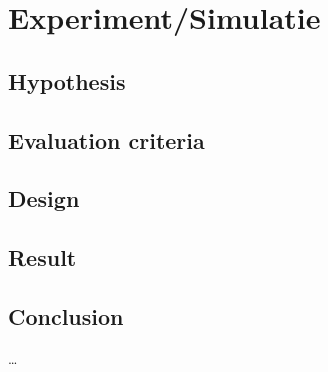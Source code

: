 \chapter{Experiment/Simulatie}                                  \label{ch:experiment}

\section{Hypothesis}
\section{Evaluation criteria}
\section{Design}
\section{Result}
\section{Conclusion}


\ldots


\cleardoublepage

